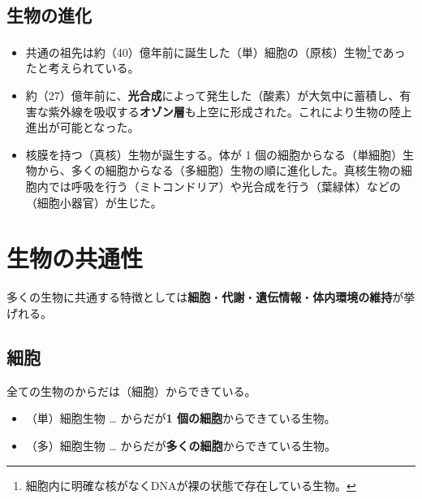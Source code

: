 \subsection{生物の進化}
\begin{itemize}\setlength{\leftskip}{-1.00zw}%
\item[\ajMaru{1}] 共通の祖先は約（\textcolor{black!10}{40}）億年前に誕生した（\textcolor{black!10}{単}）細胞の（\textcolor{black!10}{原核}）生物\footnote{細胞内に明確な核がなくDNAが裸の状態で存在している生物。}であったと考えられている。
\item[\ajMaru{2}] 約（\textcolor{black!10}{27}）億年前に、\textbf{光合成}によって発生した（\textcolor{black!10}{酸素}）が大気中に蓄積し、有害な紫外線を吸収する\textbf{オゾン層}も上空に形成された。これにより生物の陸上進出が可能となった。
\item[\ajMaru{3}] 核膜を持つ（\textcolor{black!10}{真核}）生物が誕生する。体が 1 個の細胞からなる（\textcolor{black!10}{単細胞}）生物から、多くの細胞からなる（\textcolor{black!10}{多細胞}）生物の順に進化した。真核生物の細胞内では呼吸を行う（\textcolor{black!10}{ミトコンドリア}）や光合成を行う（\textcolor{black!10}{葉緑体}）などの（\textcolor{black!10}{細胞小器官}）が生じた。
\end{itemize}
\section{生物の共通性}
多くの生物に共通する特徴としては\textbf{細胞}・\textbf{代謝}・\textbf{遺伝情報}・\textbf{体内環境の維持}が挙げれる。
\subsection{細胞}
全ての生物のからだは（\textcolor{black!10}{細胞}）からできている。
\begin{itemize}\setlength{\leftskip}{-1.00zw}%
\item[\ajMaru{1}]（\textcolor{black!10}{単}）細胞生物 … からだが\textbf{1 個の細胞}からできている生物。
\item[\ajMaru{2}]（\textcolor{black!10}{多}）細胞生物 … からだが\textbf{多くの細胞}からできている生物。
\end{itemize}
